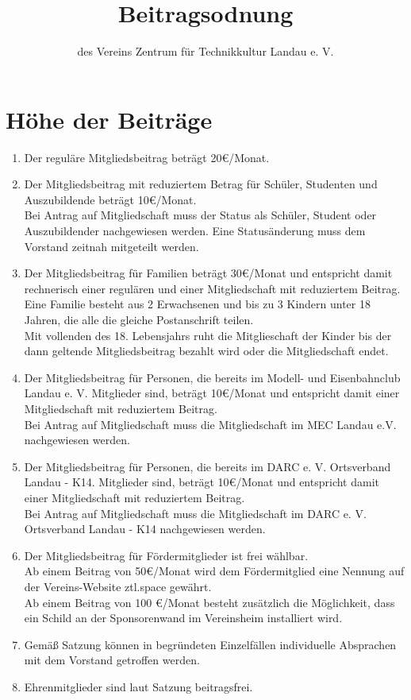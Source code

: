 \documentclass[a4paper, 12pt]{scrartcl}
\begin{document}
\title{Beitragsodnung}
\subtitle{des Vereins Zentrum für Technikkultur Landau e. V.}
\author{}
\date{}

\maketitle

\section{Höhe der Beiträge}
\begin{enumerate}
	\item Der reguläre Mitgliedsbeitrag beträgt 20\euro/Monat.
	\item Der Mitgliedsbeitrag mit reduziertem Betrag für Schüler, Studenten und Auszubildende beträgt 10\euro/Monat.\\ 
	Bei Antrag auf Mitgliedschaft muss der Status als Schüler, Student oder Auszubildender nachgewiesen werden.
	Eine Statusänderung muss dem Vorstand zeitnah mitgeteilt werden.
	\item Der Mitgliedsbeitrag für Familien beträgt 30\euro/Monat und entspricht damit rechnerisch einer regulären und einer Mitgliedschaft mit reduziertem Beitrag. \\ 
Eine Familie besteht aus 2 Erwachsenen und bis zu 3 Kindern unter 18 Jahren, die alle die gleiche Postanschrift teilen.\\
Mit vollenden des 18. Lebensjahrs ruht die Mitglieschaft der Kinder bis der dann geltende Mitgliedsbeitrag bezahlt wird oder die Mitgliedschaft endet. 
	\item Der Mitgliedsbeitrag für Personen, die bereits im Modell- und Eisenbahnclub Landau e. V. Mitglieder sind, beträgt 10\euro/Monat und entspricht damit einer Mitgliedschaft mit reduziertem Beitrag.\\ Bei Antrag auf Mitgliedschaft muss die Mitgliedschaft im MEC Landau e.V. nachgewiesen werden.
	\item Der Mitgliedsbeitrag für Personen, die bereits im DARC e. V. Ortsverband Landau - K14. Mitglieder sind, beträgt 10\euro/Monat und entspricht damit einer Mitgliedschaft mit reduziertem Beitrag.\\ Bei Antrag auf Mitgliedschaft muss die Mitgliedschaft im DARC e. V. Ortsverband Landau - K14 nachgewiesen werden.
	\item Der Mitgliedsbeitrag für Fördermitglieder ist frei wählbar. \\
	Ab einem Beitrag von 50\euro/Monat wird dem Fördermitglied eine Nennung auf der Vereins-Website ztl.space gewährt. \\
	Ab einem Beitrag von 100 \euro/Monat besteht zusätzlich die Möglichkeit, dass ein Schild an der Sponsorenwand im Vereinsheim installiert wird.
	\item Gemäß Satzung können in begründeten Einzelfällen individuelle Absprachen mit dem Vorstand getroffen werden. 
	\item Ehrenmitglieder sind laut Satzung beitragsfrei.
\end{enumerate}
\end{document}
